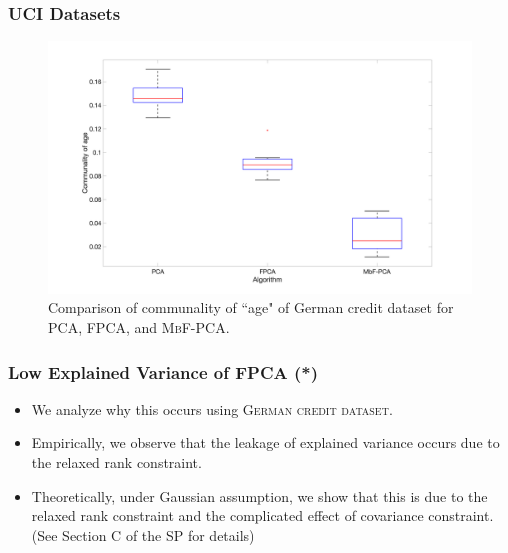 \documentclass{beamer}
\begin{document}
\begin{frame}
	\frametitle{UCI Datasets}
	\begin{figure}[!t]
		\begin{center}
			\includegraphics[width=0.8\linewidth]{figures/exp2-2/eda_german.png}
		\end{center}
		\caption{\label{fig:exp2-2-eda} Comparison of communality of ``age" of German credit dataset for PCA, \textsc{FPCA}, and \textsc{MbF-PCA}.}
	\end{figure}
\end{frame}


\begin{frame}
	\frametitle{Low Explained Variance of FPCA (*)}
	\begin{itemize}
		\item We analyze why this occurs using \textsc{German credit dataset}.
		
		\item Empirically, we observe that the leakage of explained variance occurs due to the relaxed rank constraint.
		
		\item Theoretically, under Gaussian assumption, we show that this is due to the relaxed rank constraint and the complicated effect of covariance constraint. (See Section C of the SP \cite{Lee21} for details)
	\end{itemize}
\end{frame}
\end{document}
